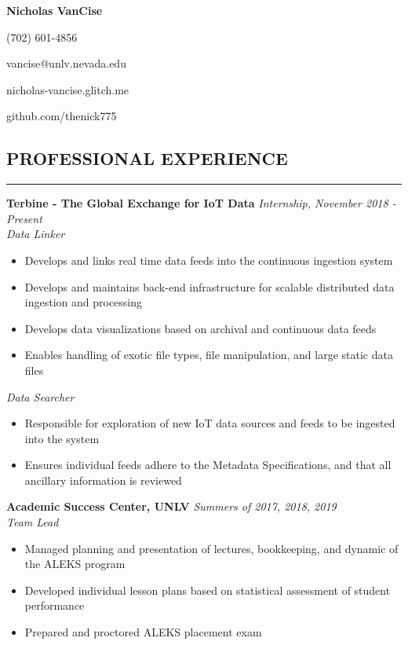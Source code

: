 \documentclass{res}
\begin{document}
	\thispagestyle{empty} %
	\centerline{\bf \Large{Nicholas VanCise}}
	\centerline{(702) 601-4856}
	\centerline{vancise@unlv.nevada.edu}
  \centerline{nicholas-vancise.glitch.me}
  \centerline{github.com/thenick775}
  \vspace{-10pt}

	\begin{resume}

		\section{{PROFESSIONAL EXPERIENCE}}
    \noindent\rule[0.5ex]{\linewidth}{1pt}
		{\bf Terbine - The Global Exchange for IoT Data} \hfill \emph{Internship, November 2018 - Present} \\
			\emph{Data Linker}

			\begin{itemize} \itemsep -2pt
				\item Develops and links real time data feeds into the continuous ingestion system
				\item Develops and maintains back-end infrastructure for scalable distributed data ingestion and processing
				\item Develops data visualizations based on archival and continuous data feeds
				\item Enables handling of exotic file types, file manipulation, and large static data files
			\end{itemize} \vspace{-2mm}

			\emph{Data Searcher}

			\begin{itemize} \itemsep -2pt
				\item Responsible for exploration of new IoT data sources and feeds to be ingested into the system
				\item Ensures individual feeds adhere to the Metadata Specifications, and that all ancillary information is reviewed
			\end{itemize} \vspace{-2mm}

		{\bf Academic Success Center, UNLV} \hfill \emph{Summers of 2017, 2018, 2019} \\
			\emph{Team Lead}

			\begin{itemize} \itemsep -2pt
				\item Managed planning and presentation of lectures, bookkeeping, and dynamic of the ALEKS program
				\item Developed individual lesson plans based on statistical assessment of student performance
        \item Prepared and proctored ALEKS placement exam
			\end{itemize}


\end{resume}
\end{document}
